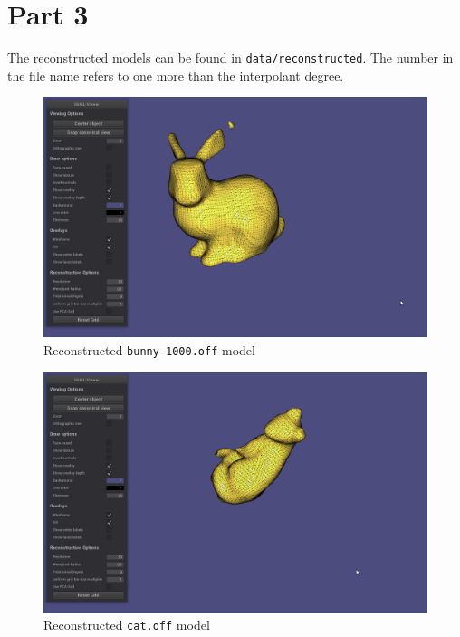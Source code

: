 \documentclass[11pt]{article}
\begin{document}
\pagebreak

\section*{Part 3}
The reconstructed models can be found in \texttt{data/reconstructed}. The number in the file name refers to one more than the interpolant degree.

\begin{figure}[h]
\includegraphics[scale=0.3]{bunny_reconstructed.png}
\caption{Reconstructed \texttt{bunny-1000.off} model}
\end{figure}

\begin{figure}[h]
\includegraphics[scale=0.3]{cat_reconstructed.png}
\caption{Reconstructed \texttt{cat.off} model}
\end{figure}
\end{document}
